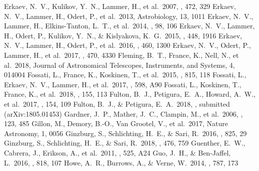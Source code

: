 \documentclass{aa}
\begin{document}
\begin{thebibliography}{}
    Erkaev, N.~V., Kulikov, Y.~N., Lammer, H., et al.\ 2007, \aap, 472, 329
    Erkaev, N.~V., Lammer, H., Odert, P., et al.\ 2013, Astrobiology, 13,           1011
    Erkaev, N.~V., Lammer, H., Elkins-Tanton, L.~T., et al.\ 2014, \planss,         98, 106
    Erkaev, N.~V., Lammer, H., Odert, P., Kulikov, Y.~N., \& Kislyakova,            K.~G.\ 2015, \mnras, 448, 1916
    Erkaev, N.~V., Lammer, H., Odert, P., et al.\ 2016, \mnras, 460, 1300
    Erkaev, N.~V., Odert, P., Lammer, H., et al.\ 2017, \mnras, 470, 4330
    Fleming, B.~T., France, K., Nell, N., et al.\ 2018, Journal of Astronomical Telescopes, Instruments, and Systems, 4, 014004
    Fossati, L., France, K., Koskinen, T., et al.\ 2015, \apj, 815, 118
    Fossati, L., Erkaev, N.~V., Lammer, H., et al.\ 2017, \aap, 598, A90
    Fossati, L., Koskinen, T., France, K., et al.\ 2018, \aj, 155, 113
    Fulton, B.~J., Petigura, E.~A., Howard, A.~W., et al.\ 2017, \aj, 154,          109
    Fulton, B.~J., \& Petigura, E.~A.\ 2018, \aj, submitted (arXiv:1805.01453)
    Gardner, J.~P., Mather, J.~C., Clampin, M., et al.\ 2006, \ssr, 123, 485
    Gillon, M., Demory, B.-O., Van Grootel, V., et al.\ 2017, Nature Astronomy, 1, 0056
    Ginzburg, S., Schlichting, H.~E., \& Sari, R.\ 2016, \apj, 825, 29
    Ginzburg, S., Schlichting, H.~E., \& Sari, R.\ 2018, \mnras, 476, 759
    Guenther, E.~W., Cabrera, J., Erikson, A., et al.\ 2011, \aap, 525, A24
    Guo, J.~H., \& Ben-Jaffel, L.\ 2016, \apj, 818, 107
    Howe, A.~R., Burrows, A., \& Verne, W.\ 2014, \apj, 787, 173

\end{thebibliography}
\end{document}
